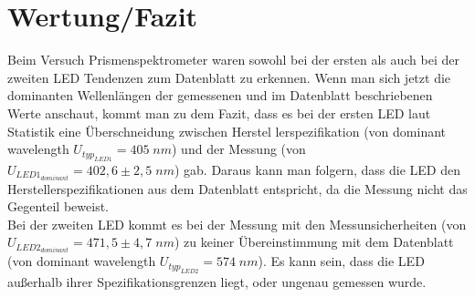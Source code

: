 \documentclass[a4paper]{scrartcl}
\numberwithin{equation}{subsection}
\begin{document}
\newpage
\section{Wertung/Fazit}
Beim Versuch Prismenspektrometer waren sowohl bei der ersten als auch bei der zweiten LED Tendenzen zum Datenblatt zu erkennen.
Wenn man sich jetzt die dominanten Wellenlängen der gemessenen und im Datenblatt beschriebenen Werte anschaut, kommt man zu dem Fazit, dass es bei der ersten LED laut Statistik eine Überschneidung zwischen Herstel lerspezifikation (von dominant wavelength $U_{typ_{LED1}} = 405\;nm$) und der Messung (von $U_{LED1_{dominant}} = 402,6\pm2,5\;nm$) gab.
Daraus kann man folgern, dass die LED den Herstellerspezifikationen aus dem Datenblatt entspricht, da die Messung nicht das Gegenteil beweist.
\\
Bei der zweiten LED kommt es bei der Messung mit den Messunsicherheiten (von $U_{LED2_{dominant}} = 471,5\pm 4,7\;nm$) zu keiner Übereinstimmung mit dem Datenblatt (von dominant wavelength $U_{typ_{LED2}} = 574\;nm$).
Es kann sein, dass die LED außerhalb ihrer Spezifikationsgrenzen liegt, oder ungenau gemessen wurde.

\newpage


\label{LastPage}
\end{document}
